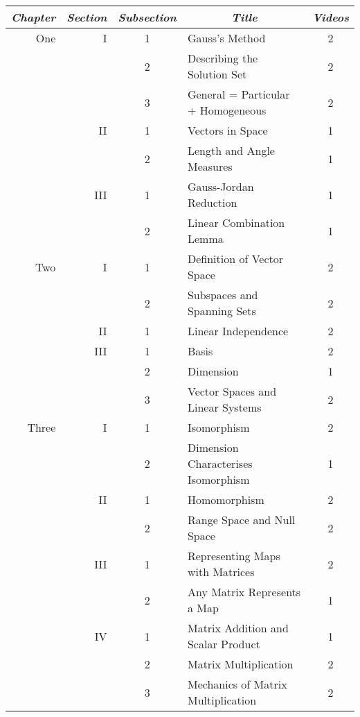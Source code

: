 \documentclass{article}
\begin{document}
\begin{center}
\begin{tabular}{|rrc|lc|}
  \multicolumn{1}{c}{\textit{Chapter}} 
  &\multicolumn{1}{c}{\textit{Section}} 
  &\multicolumn{1}{c}{\textit{Subsection}} 
  &\multicolumn{1}{c}{\textit{Title}} 
  &\multicolumn{1}{c}{\textit{Videos}} 
  \\ \hline
  One &I   &1 &Gauss's Method                     &2   \\
      &    &2 &Describing the Solution Set        &2   \\
      &    &3 &General = Particular + Homogeneous &2   \\
      \cline{4-5}
      &II  &1  &Vectors in Space                  &1   \\
      &    &2  &Length and Angle Measures         &1   \\
      \cline{4-5}
      &III &1  &Gauss-Jordan Reduction            &1   \\
      &    &2  &Linear Combination Lemma          &1   \\
 \hline
 Two  &I   &1 &Definition of Vector Space         &2   \\
      &    &2 &Subspaces and Spanning Sets        &2   \\
      \cline{4-5}
      &II  &1 &Linear Independence                &2   \\
      \cline{4-5}
      &III &1 &Basis                              &2   \\
      &    &2 &Dimension                          &1   \\
      &    &3 &Vector Spaces and Linear Systems   &2   \\
 \hline
 Three&I   &1 &Isomorphism                        &2   \\
      &    &2 &Dimension Characterises Isomorphism&1   \\
      \cline{4-5}
      &II  &1 &Homomorphism                       &2   \\
      &    &2 &Range Space and Null Space         &2   \\
      \cline{4-5}
      &III &1 &Representing Maps with Matrices    &2   \\
      &    &2 &Any Matrix Represents a Map        &1   \\
      \cline{4-5}
      &IV  &1 &Matrix Addition and Scalar Product &1   \\
      &    &2 &Matrix Multiplication              &2   \\
      &    &3 &Mechanics of Matrix Multiplication &2   \\

\end{tabular}
\end{center}
\end{document}
